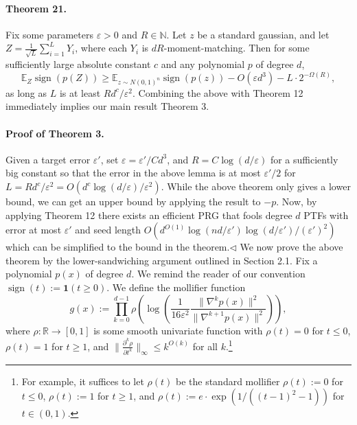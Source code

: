 \paragraph{Theorem 21.} Fix some parameters $\varepsilon>0$ and $R\in\mathbb N$. Let $z$ be a standard gaussian, and let $Z=\frac1{\sqrt L}\sum_{i=1}^LY_i$, where each $Y_i$ is $dR$-moment-matching. Then for some sufficiently large absolute constant $c$ and any polynomial $p$ of degree $d$,
\[\mathbb E_Z\operatorname{sign}(p(Z))\geq\mathbb E_{z\sim N(0,1)^n}\operatorname{sign}(p(z))-O(\varepsilon d^3)-L\cdot2^{-\Omega(R)},\]
as long as $L$ is at least $Rd^c/\varepsilon^2$.
Combining the above with Theorem 12 immediately implies our main result Theorem 3.
\paragraph{Proof of Theorem 3.} Given a target error $\varepsilon'$, set $\varepsilon=\varepsilon'/Cd^3$, and $R=C\log(d/\varepsilon)$ for a sufficiently big constant so that the error in the above lemma is at most $\varepsilon'/2$ for $L=Rd^c/\varepsilon^2=O(d^c\log(d/\varepsilon)/\varepsilon^2)$. While the above theorem only gives a lower bound, we can get an upper bound by applying the result to $-p$. Now, by applying Theorem 12 there exists an efficient PRG that fools degree $d$ PTFs with error at most $\varepsilon'$ and seed length $O(d^{O(1)}\log(nd/\varepsilon')\log(d/\varepsilon')/(\varepsilon')^2)$ which can be simplified to the bound in the theorem.\hfill$\triangleleft$
We now prove the above theorem by the lower-sandwiching argument outlined in Section 2.1. Fix a polynomial $p(x)$ of degree $d$. We remind the reader of our convention $\operatorname{sign}(t):=\boldsymbol1(t\geq0)$.
We define the mollifier function
\[g(x):=\prod_{k=0}^{d-1}\rho\left(\log\left(\frac1{16\varepsilon^2}\frac{\|\nabla^kp(x)\|^2}{\|\nabla^{k+1}p(x)\|^2}\right)\right),\]
where $\rho:\mathbb R\to[0,1]$ is some smooth univariate function with $\rho(t)=0$ for $t\leq0$, $\rho(t)=1$ for $t\geq1$, and $\|\frac{\partial^k\rho}{\partial t^k}\|_\infty\leq k^{O(k)}$ for all $k$.\footnote{For example, it suffices to let $\rho(t)$ be the standard mollifier $\rho(t):=0$ for $t\leq0$, $\rho(t):=1$ for $t\geq1$, and $\rho(t):=e\cdot\exp(1/((t-1)^2-1))$ for $t\in(0,1)$.}
